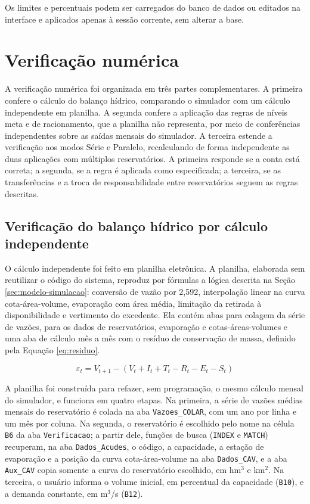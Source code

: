 Os limites e percentuais podem ser carregados do banco de dados ou editados na interface e aplicados apenas à sessão corrente, sem alterar a base.

\section{Verificação numérica}
\label{sec:metodo-verificacao}

A verificação numérica foi organizada em três partes complementares. A primeira confere o cálculo do balanço hídrico, comparando o simulador com um cálculo independente em planilha. A segunda confere a aplicação das regras de níveis meta e de racionamento, que a planilha não representa, por meio de conferências independentes sobre as saídas mensais do simulador. A terceira estende a verificação aos modos Série e Paralelo, recalculando de forma independente as duas aplicações com múltiplos reservatórios. A primeira responde se a conta está correta; a segunda, se a regra é aplicada como especificada; a terceira, se as transferências e a troca de responsabilidade entre reservatórios seguem as regras descritas.

\subsection{Verificação do balanço hídrico por cálculo independente}
\label{subsec:metodo-verif-balanco}

O cálculo independente foi feito em planilha eletrônica. A planilha, elaborada sem reutilizar o código do sistema, reproduz por fórmulas a lógica descrita na Seção \ref{sec:modelo-simulacao}: conversão de vazão por 2,592, interpolação linear na curva cota-área-volume, evaporação com área média, limitação da retirada à disponibilidade e vertimento do excedente. Ela contém abas para colagem da série de vazões, para os dados de reservatórios, evaporação e cotas-áreas-volumes e uma aba de cálculo mês a mês com o resíduo de conservação de massa, definido pela Equação \ref{eq:residuo}.

\begin{equation}
    \varepsilon_t = V_{t+1} - \left(V_t + I_t + T_t - R_t - E_t - S_t\right)
    \label{eq:residuo}
\end{equation}

A planilha foi construída para refazer, sem programação, o mesmo cálculo mensal do simulador, e funciona em quatro etapas. Na primeira, a série de vazões médias mensais do reservatório é colada na aba \texttt{Vazoes\_COLAR}, com um ano por linha e um mês por coluna. Na segunda, o reservatório é escolhido pelo nome na célula \texttt{B6} da aba \texttt{Verificacao}; a partir dele, funções de busca (\texttt{INDEX} e \texttt{MATCH}) recuperam, na aba \texttt{Dados\_Acudes}, o código, a capacidade, a estação de evaporação e a posição da curva cota-área-volume na aba \texttt{Dados\_CAV}, e a aba \texttt{Aux\_CAV} copia somente a curva do reservatório escolhido, em hm$^3$ e km$^2$. Na terceira, o usuário informa o volume inicial, em percentual da capacidade (\texttt{B10}), e a demanda constante, em m$^3$/s (\texttt{B12}).

